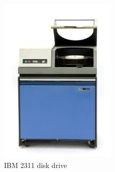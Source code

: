 \begin{frame}
\begin{columns}
\begin{column}{0.5\textwidth}
\begin{block}{}
\begin{figure}
                    \includegraphics[width=0.5\textwidth,height=\textheight,keepaspectratio]{resources/made/ibmdisk_2311.png}
                    \caption[]{IBM 2311 disk drive}
                \end{figure}
            \end{block}
        \end{column}
    \end{columns}

    \framebreak


\end{frame}
